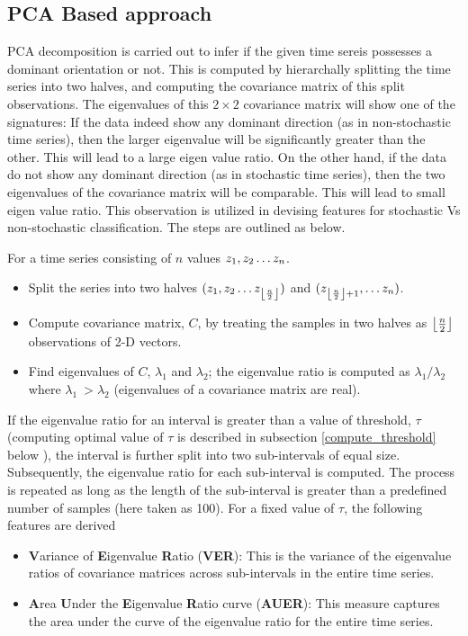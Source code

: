 \documentclass[journal]{IEEEtran}
\DeclarePairedDelimiter\floor{\lfloor}{\rfloor}
\begin{document}
	\subsection{PCA Based approach}
	
	PCA  decomposition is carried out to infer if the given time sereis possesses a dominant orientation or not. This is computed by hierarchally splitting the time series into two halves, and computing the covariance matrix of this split observations. The eigenvalues of this $2 \times 2$ covariance matrix will show one of the signatures: If the data indeed show any dominant direction (as in non-stochastic time series), then the larger eigenvalue will be significantly greater than the other. This will lead to a large eigen value ratio. On the other hand, if the data do not show any dominant direction (as in stochastic time series), then the two eigenvalues of the covariance matrix will be comparable. This will lead to small eigen value ratio. This observation is utilized in devising features for stochastic Vs non-stochastic classification. The steps are outlined as below.
	
	For a time series consisting of $n$ values  $z_1, z_2 \mathellipsis z_n$.
	\begin{itemize}
		\item  Split the series into two halves $(z_1, z_2 \mathellipsis z_{\floor*{\frac{n}{2}}})$ and $(z_{\floor*{\frac{n}{2}} + 1}, \mathellipsis z_n)$.
		\item Compute covariance matrix, $C$,  by treating the samples in two halves as $\floor*{\frac{n}{2}}$ observations of 2-D vectors.
		\item Find eigenvalues of $C$, $\lambda_1$ and $\lambda_2$; the eigenvalue ratio is computed as  $\lambda_1/\lambda_2$ where $\lambda_1 \ > \lambda_2$ (eigenvalues of a covariance matrix are real).
	\end{itemize}
	If the eigenvalue ratio for an interval is greater than a value of threshold, $\tau$ (computing optimal value of $\tau$ is described in subsection \ref{compute_threshold} below ), the interval is further split into two sub-intervals of equal size.  Subsequently, the eigenvalue ratio for each sub-interval is computed. The process is repeated as long as the length of the sub-interval is greater than a predefined number of samples (here taken as 100).
	For a fixed value of $\tau$, the following features are derived
	\begin{itemize}
		\item \textbf{V}ariance of \textbf{E}igenvalue \textbf{R}atio (\textbf{VER}): This is the variance of the eigenvalue ratios of covariance matrices across sub-intervals in the entire time series.
		\item \textbf{A}rea \textbf{U}nder the \textbf{E}igenvalue \textbf{R}atio curve (\textbf{AUER}): This measure captures the area under the curve of the eigenvalue ratio for the entire time series.
	\end{itemize}
	
\end{document}
